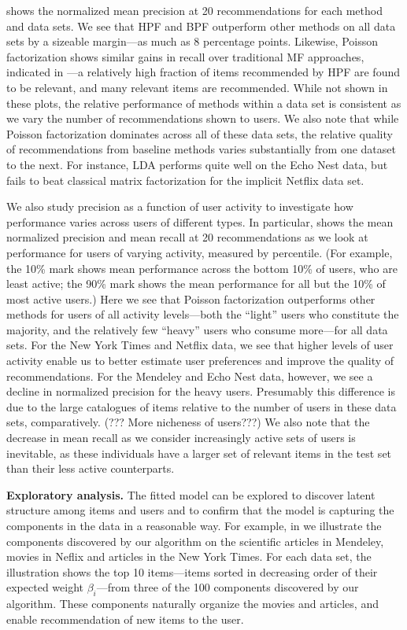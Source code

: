  shows the normalized mean precision at 20
recommendations for each method and data sets. We see that HPF and BPF
outperform other methods on all data sets by a sizeable margin---as
much as 8 percentage points. Likewise, Poisson factorization shows
similar gains in recall over traditional MF approaches, indicated in
---a relatively high fraction of items recommended
by HPF are found to be relevant, and many relevant items are
recommended. While not shown in these plots, the relative performance
of methods within a data set is consistent as we vary the number of
recommendations shown to users. We also note that while Poisson
factorization dominates across all of these data sets, the relative
quality of recommendations from baseline methods varies substantially
from one dataset to the next. For instance, LDA performs quite well on
the Echo Nest data, but fails to beat classical matrix factorization
for the implicit Netflix data set.

We also study precision as a function of user activity to investigate
how performance varies across users of different types. In particular,
 shows the mean normalized
precision and mean recall at 20 recommendations as we look at
performance for users of varying activity, measured by
percentile. (For example, the 10\% mark shows mean performance across
the bottom 10\% of users, who are least active; the 90\% mark shows
the mean performance for all but the 10\% of most active users.) Here
we see that Poisson factorization outperforms other methods for users
of all activity levels---both the ``light'' users who constitute the
majority, and the relatively few ``heavy'' users who consume
more---for all data sets. For the New York Times and Netflix data, we
see that higher levels of user activity enable us to better estimate
user preferences and improve the quality of recommendations. For the
Mendeley and Echo Nest data, however, we see a decline in normalized
precision for the heavy users. Presumably this difference is due to
the large catalogues of items relative to the number of users in these
data sets, comparatively. (??? More nicheness of users???) We also
note that the decrease in mean recall as we consider increasingly
active sets of users is inevitable, as these individuals have a larger
set of relevant items in the test set than their less active
counterparts.

{\bf Exploratory analysis.} The fitted model can be explored to
discover latent structure among items and users and to confirm that
the model is capturing the components in the data in a reasonable
way. For example, in  we illustrate the components
discovered by our algorithm on the scientific articles in Mendeley,
movies in Neflix and articles in the New York Times. For each data
set, the illustration shows the top 10 items---items sorted in
decreasing order of their expected weight $\beta_i$---from three of
the 100 components discovered by our algorithm. These components
naturally organize the movies and articles, and enable recommendation
of new items to the user.

